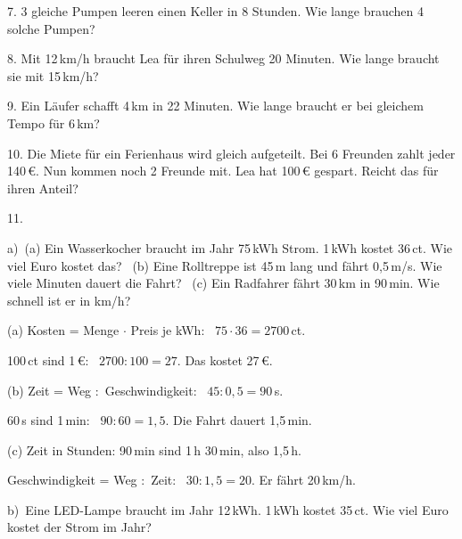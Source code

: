 \documentclass[11pt]{article}
\newcommand{\grau}[1]{{\color{mbgrau}#1}}
\begin{document}
\begin{pfaufg}{}{7.}{}
3 gleiche Pumpen leeren einen Keller in 8 Stunden. Wie lange brauchen 4 solche Pumpen?
\end{pfaufg}

\begin{pfaufg}{}{8.}{}
Mit 12\,km/h braucht Lea für ihren Schulweg 20 Minuten. Wie lange braucht sie mit 15\,km/h?
\end{pfaufg}

\begin{pfaufg}{}{9.}{}
Ein Läufer schafft 4\,km in 22 Minuten. Wie lange braucht er bei gleichem Tempo für 6\,km?
\end{pfaufg}

\begin{pfaufg}{}{10.}{}
Die Miete für ein Ferienhaus wird gleich aufgeteilt. Bei 6 Freunden zahlt jeder 140\,€. Nun kommen noch 2 Freunde mit. Lea hat 100\,€ gespart. Reicht das für ihren Anteil?
\end{pfaufg}

\begin{pfaufg}{}{11.}{}
\grau{a)\ (a) Ein Wasserkocher braucht im Jahr 75\,kWh Strom. 1\,kWh kostet 36\,ct. Wie viel Euro kostet das? \ (b) Eine Rolltreppe ist 45\,m lang und fährt 0{,}5\,m/s. Wie viele Minuten dauert die Fahrt? \ (c) Ein Radfahrer fährt 30\,km in 90\,min. Wie schnell ist er in km/h?\par\smallskip (a) Kosten = Menge $\cdot$ Preis je kWh: \ $75 \cdot 36 = 2700$\,ct.\par 100\,ct sind 1\,€: \ $2700 : 100 = 27$. Das kostet 27\,€.\par (b) Zeit = Weg $:$ Geschwindigkeit: \ $45 : 0{,}5 = 90$\,s.\par 60\,s sind 1\,min: \ $90 : 60 = 1{,}5$. Die Fahrt dauert 1{,}5\,min.\par (c) Zeit in Stunden: 90\,min sind 1\,h 30\,min, also 1{,}5\,h.\par Geschwindigkeit = Weg $:$ Zeit: \ $30 : 1{,}5 = 20$. Er fährt 20\,km/h.}
\par\medskip
b)\ Eine LED-Lampe braucht im Jahr 12\,kWh. 1\,kWh kostet 35\,ct. Wie viel Euro kostet der Strom im Jahr?
\end{pfaufg}
\end{document}
